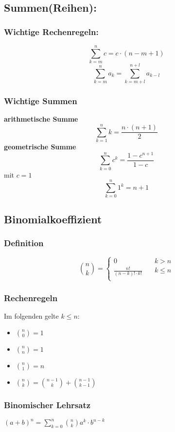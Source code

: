 \documentclass[12pt,a4paper]{article}
\begin{document}
\subsection{Summen(Reihen):}
\subsubsection{Wichtige Rechenregeln:}
\[\sum_{k=m}^nc=c\cdot(n-m+1)\]
\[\sum_{k=m}^na_k=\sum_{k=m+l}^{n+l}a_{k-l}\]

\subsubsection{Wichtige Summen}
\textbf{arithmetische Summe}
\[\sum_{k=1}^nk=\frac{n\cdot(n+1)}{2}\]
\textbf{geometrische Summe}
\[\sum_{k=0}^nc^k=\frac{1-c^{n+1}}{1-c}\]
mit $c=1$
\[\sum_{k=0}^n1^k=n+1\]

\subsection{Binomialkoeffizient}
\subsubsection{Definition}
\[\binom{n}{k}=\begin{cases}
					0 &\quad k>n\\
					\frac{n!}{(n-k)!\cdot k!} &\quad k\leq n\\
				\end{cases}\]

\subsubsection{Rechenregeln}
Im folgenden gelte $k\leq n$:\\

\begin{itemize}
\item $\binom{n}{0}=1$
\item $\binom{n}{n}=1$
\item $\binom{n}{1}=n$
\item $\binom{n}{k}=\binom{n-1}{k}+\binom{n-1}{k-1}$
\end{itemize}

\subsubsection{Binomischer Lehrsatz}
$(a+b)^n=\sum_{k=0}^n \binom{n}{k}a^k\cdot b^{n-k}$
\end{document}
